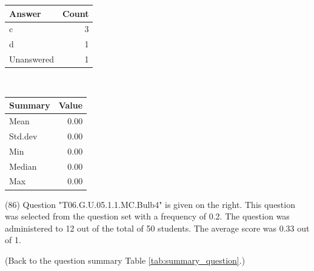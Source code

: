 \documentclass[12pt,english,nohyper]{tufte-handout}\usepackage[]{graphicx}\usepackage[]{color}
\begin{document}
\begin{center}%
\begin{tabular}{lr}
  \hline
Answer & Count \\ 
  \hline
c &   3 \\ 
  d &   1 \\ 
  Unanswered &   1 \\ 
   \hline
\end{tabular}
~~~~~~~~%
\begin{tabular}{lr}
  \hline
Summary & Value \\ 
  \hline
Mean & 0.00 \\ 
  Std.dev & 0.00 \\ 
  Min & 0.00 \\ 
  Median & 0.00 \\ 
  Max & 0.00 \\ 
   \hline
\end{tabular}
\end{center}\newpage{} (86) Question "T06.G.U.05.1.1.MC.Bulb4" is given on the right. This question was selected from the question set with a frequency of 0.2. The question was administered to 12 out of the total of 50 students. The average score was 0.33 out of 1.

 (Back to the question summary Table \ref{tab:summary_question}.)
\end{document}
